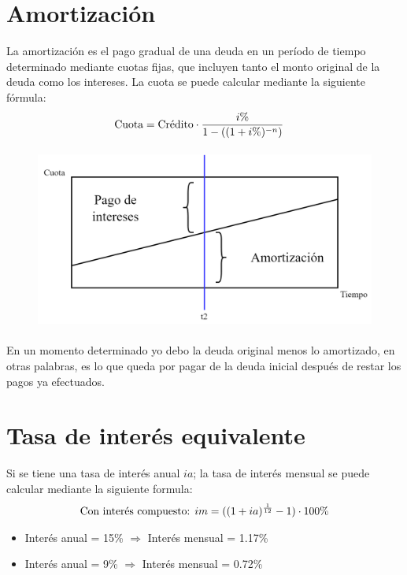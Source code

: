 \documentclass{templateNote}
\begin{document}
\section{Amortización}
\noindent La amortización es el pago gradual de una deuda en un período de tiempo determinado mediante cuotas fijas, que incluyen tanto el monto original de la deuda como los intereses. La cuota se puede calcular mediante la siguiente fórmula:
\begin{align*}
    \textnormal{Cuota} &= \textnormal{Crédito} \cdot \frac{i\%}{1-((1+i\%)^{-n})}
\end{align*}
\begin{figure}[H]
    \centering
    \includegraphics[height=6cm]{img/amortiz.png}
\end{figure}

\begin{tcolorbox}[colback=orange!10!white,colframe=orange!60!black,title=Observación]
    En un momento determinado yo debo la deuda original menos lo amortizado, en otras palabras, es lo que queda por pagar de la deuda inicial después de restar los pagos ya efectuados.
\end{tcolorbox}
\newpage

\section{Tasa de interés equivalente}
\noindent Si se tiene una tasa de interés anual $ia$; la tasa de interés mensual se puede calcular mediante la siguiente formula:
\begin{align*}
    \textnormal{Con interés compuesto: }im &= ((1 + ia)^{\frac{1}{12}} - 1) \cdot 100\%\\
\end{align*}

\begin{tcolorbox}[colback=blue!10!white,colframe=blue!60!black,title=Ejecicios]
    \begin{itemize}
        \item Interés anual = 15\% $\Rightarrow$ Interés mensual = 1.17\%
        \item Interés anual = 9\% $\Rightarrow$ Interés mensual = 0.72\%
    \end{itemize}
\end{tcolorbox}
\end{document}
